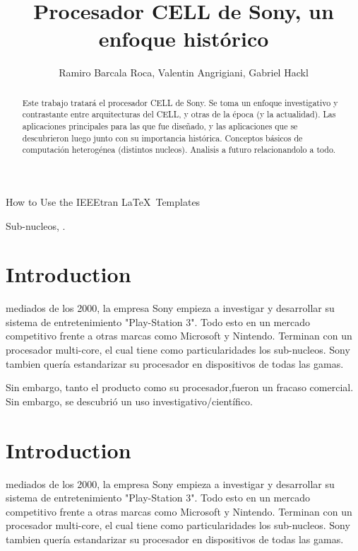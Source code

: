 \documentclass[12pt,compsoc]{IEEEtran}
\begin{document}
	\title{Procesador CELL de Sony, un enfoque histórico}
	\author{Ramiro Barcala Roca, Valentin Angrigiani, Gabriel Hackl}
		
	{How to Use the IEEEtran \LaTeX \ Templates}
	\maketitle
	
	\begin{abstract}
		Este trabajo tratará el procesador CELL de Sony. Se toma un enfoque investigativo y contrastante entre arquitecturas del CELL, y otras de la época (y la actualidad). Las aplicaciones principales para las que fue diseñado, y las aplicaciones que se descubrieron luego junto  con su importancia histórica. Conceptos básicos de computación heterogénea (distintos nucleos). Analisis a futuro relacionandolo a todo.
	\end{abstract}
	
	\begin{IEEEkeywords}
		Sub-nucleos, .
	\end{IEEEkeywords}
	
	\section{Introduction}
	 mediados de los 2000, la empresa Sony empieza a investigar y desarrollar su sistema de entretenimiento "Play-Station 3". Todo esto en un mercado competitivo frente a otras marcas como Microsoft y Nintendo. Terminan con un procesador multi-core, el cual tiene como particularidades los sub-nucleos. Sony tambien quería estandarizar su procesador en dispositivos de todas las gamas.
	
	Sin embargo, tanto el producto como su procesador,fueron un fracaso comercial. Sin embargo, se descubrió un uso investigativo/científico.
	
	\section{Introduction}
	 mediados de los 2000, la empresa Sony empieza a investigar y desarrollar su sistema de entretenimiento "Play-Station 3". Todo esto en un mercado competitivo frente a otras marcas como Microsoft y Nintendo. Terminan con un procesador multi-core, el cual tiene como particularidades los sub-nucleos. Sony tambien quería estandarizar su procesador en dispositivos de todas las gamas.
	
\end{document}
